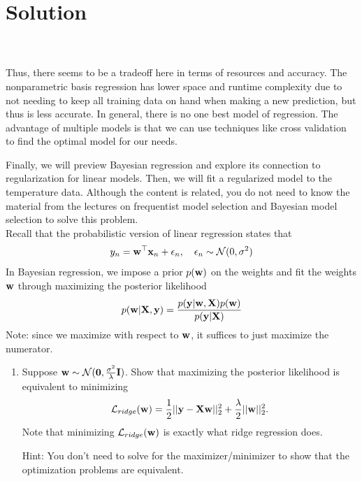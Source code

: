 \documentclass[submit]{../harvardml}
\newenvironment{solution}
  {\color{black}\section*{Solution}}
{}
\begin{document}
\begin{solution}
\begin{tcolorbox}
        \\
        \\
        Thus, there seems to be a tradeoff here in terms of resources and accuracy. The nonparametric basis regression has lower space and runtime complexity due to not needing to keep all training data on hand when making a new prediction, but thus is less accurate. In general, there is no one best model of regression. The advantage of multiple models is that we can use techniques like cross validation to find the optimal model for our needs.
    \end{tcolorbox}
\end{solution}

\begin{problem}

Finally, we will preview Bayesian regression and explore its connection to regularization for linear models. Then, we will fit a regularized model to the temperature data. Although the content is related, you do not need to know the material from the lectures on frequentist model selection and Bayesian model selection to solve this problem.  \\

\noindent Recall that the probabilistic version of linear regression states that 
\[y_n = \mathbf{w}^\top\mathbf{x}_n + \epsilon_n, \quad \epsilon_n \sim \mathcal{N}(0, \sigma^2)\]
In Bayesian regression, we impose a prior $p(\mathbf{w})$ on the weights and  fit the weights $\mathbf{w}$ through maximizing the posterior likelihood
\[p(\mathbf{w} | \mathbf{X}, \mathbf{y}) = \frac{p(\bold y | \mathbf{w}, \mathbf{X})p(\mathbf{w})}{p(\mathbf{y} | \mathbf{X})}\]
Note: since we maximize with respect to $\mathbf{w}$, it suffices to just maximize the numerator.

\begin{enumerate}
    \item Suppose $\mathbf{w} \sim \mathcal{N}(\mathbf{0},\frac{\sigma^2}{\lambda}\mathbf{I})$. Show that maximizing the posterior likelihood is equivalent to minimizing 
    \[\mathcal{L}_{ridge}(\mathbf{w}) = \frac{1}{2}||\mathbf{y} -\bold X\mathbf{w}||_2^2 + \frac{\lambda}{2}||\mathbf{w}||_2^2.\] 
    Note that minimizing $\mathcal{L}_{ridge}(\mathbf{w})$ is exactly what ridge regression does.
    
    Hint: You don't need to solve for the maximizer/minimizer to show that the optimization problems are equivalent.
    

\end{enumerate}
\end{problem}
\end{document}
